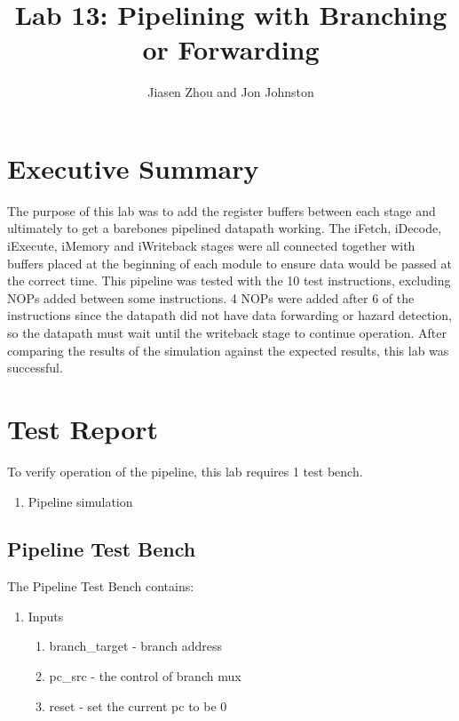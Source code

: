 \documentclass{article}
\author{Jiasen Zhou and Jon Johnston}
\title{Lab 13: Pipelining with Branching or Forwarding}
\begin{document}
\maketitle

\section{Executive Summary}
The purpose of this lab was to add the register buffers between each stage and ultimately to get a barebones pipelined datapath working. The iFetch, iDecode, iExecute, iMemory and iWriteback stages were all connected together with buffers placed at the beginning of each module to ensure data would be passed at the correct time. This pipeline was tested with the 10 test instructions, excluding NOPs added between some instructions. 4 NOPs were added after 6 of the instructions since the datapath did not have data forwarding or hazard detection, so the datapath must wait until the writeback stage to continue operation. After comparing the results of the simulation against the expected results, this lab was successful.


\section{Test Report}
To verify operation of the pipeline, this lab requires 1 test bench.
\begin{enumerate}
	\item Pipeline simulation
\end{enumerate}
\subsection{Pipeline Test Bench}
The Pipeline Test Bench contains:
\begin{enumerate}
	\item Inputs
	\begin{enumerate}
		\item branch\_target - branch address
		\item pc\_src - the control of branch mux
		\item reset - set the current pc to be 0
	\end{enumerate}	
\end{enumerate} 
\pagebreak
\end{document}
